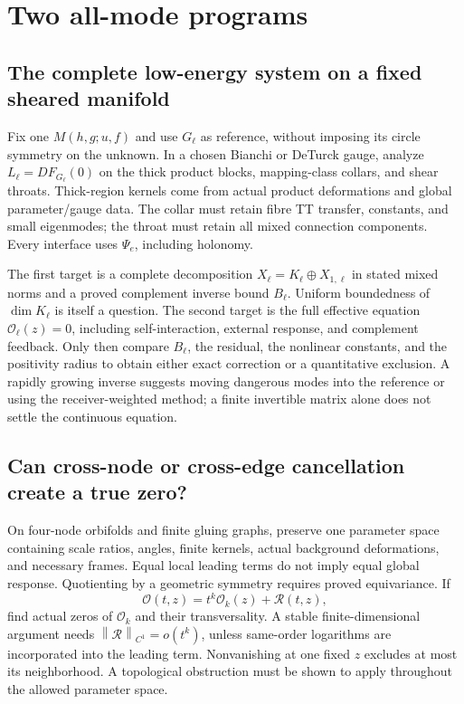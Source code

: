 \documentclass[a4paper,11pt]{article}
\theoremstyle{definition}
\newcommand{\norm}[1]{\left\lVert#1\right\rVert}
\begin{document}
\section{Two all-mode programs}\label{sec:programs}
\subsection{The complete low-energy system on a fixed sheared manifold}
\label{sec:program-A}
Fix one $M(h,g;u,f)$ and use $G_\ell$ as reference, without imposing
its circle symmetry on the unknown. In a chosen Bianchi or DeTurck
gauge, analyze $L_\ell=DF_{G_\ell}(0)$ on the thick product blocks,
mapping-class collars, and shear throats. Thick-region kernels come
from actual product deformations and global parameter/gauge data.
The collar must retain fibre TT transfer, constants, and small
eigenmodes; the throat must retain all mixed connection components.
Every interface uses $\Psi_e$, including holonomy.

The first target is a complete decomposition
$X_\ell=K_\ell\oplus X_{1,\ell}$ in stated mixed norms and a proved
complement inverse bound $B_\ell$. Uniform boundedness of
$\dim K_\ell$ is itself a question. The second target is the full
effective equation $\mathcal O_\ell(z)=0$, including self-interaction,
external response, and complement feedback. Only then compare
$B_\ell$, the residual, the nonlinear constants, and the positivity
radius to obtain either exact correction or a quantitative exclusion.
A rapidly growing inverse suggests moving dangerous modes into the
reference or using the receiver-weighted method; a finite invertible
matrix alone does not settle the continuous equation.

\subsection{Can cross-node or cross-edge cancellation create a true zero?}
\label{sec:program-B}
On four-node orbifolds and finite gluing graphs, preserve one parameter
space containing scale ratios, angles, finite kernels, actual background
deformations, and necessary frames. Equal local leading terms do not
imply equal global response. Quotienting by a geometric symmetry requires
proved equivariance.
If
\[
\mathcal O(t,z)=t^k\mathcal O_k(z)+\mathcal R(t,z),
\]
find actual zeros of $\mathcal O_k$ and their transversality.
A stable finite-dimensional argument needs
$\norm{\mathcal R}_{C^1}=o(t^k)$, unless same-order logarithms
are incorporated into the leading term. Nonvanishing at one fixed
$z$ excludes at most its neighborhood. A topological obstruction must
be shown to apply throughout the allowed parameter space.
\end{document}
